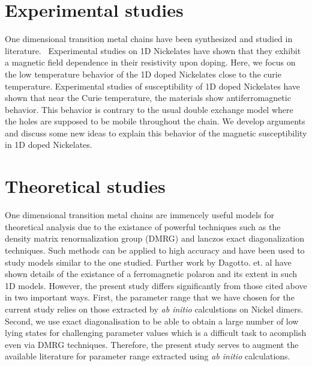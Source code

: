 \documentclass[12pt,twoside]{report}
\begin{document}
	\section*{Experimental studies}
	
	One dimensional transition metal chains have been synthesized and studied in
	literature.~\cite{darriet_compound_1993,batlogg_haldane_1994} Experimental
	studies on 1D Nickelates have shown that they exhibit a magnetic field
	dependence in their resistivity upon doping.\cite{xu_holes_2000} Here, we
	focus on the low temperature behavior of the 1D doped Nickelates close to
	the curie temperature. Experimental studies of susceptibility of 1D doped
	Nickelates have shown that near the Curie temperature, the materials show
	antiferromagnetic behavior.\cite{Ramirez} This behavior is contrary to the
	usual double exchange model where the holes are supposed to be mobile
	throughout the chain. We develop arguments and discuss some new ideas to
	explain this behavior of the magnetic susceptibility in 1D doped Nickelates.
	
	\section*{Theoretical studies}
	
	One dimensional transition metal chains are immencely useful models for
	theoretical analysis due to the existance of powerful techniques such as the
	density matrix renormalization group (DMRG) and lanczos exact
	diagonalization techniques. Such methods can be applied to high accuracy and
	have been used to study models similar to the one
	studied.\cite{dagotto_correlated_1994,patel_emergence_2020} Further work by
	Dagotto. et. al have shown details of the existance of a ferromagnetic
	polaron and its extent in such 1D models.\cite{malvezzi_origin_2001}
	However, the present study differs significantly from those cited above in
	two important ways. First, the parameter range that we have chosen for the
	current study relies on those extracted by \textit{ab initio} calculstions
	on Nickel dimers.\cite{bastardis_microscopic_2007,bastardis_isotropic_2008}
	Second, we use exact diagonalisation to be able to obtain a large number of
	low lying states for challenging parameter values which is a difficult task
	to acomplish even via DMRG techniques. Therefore, the present study serves
	to augment the available literature for parameter range extracted using
	\textit{ab initio} calculations.
	
\end{document}
